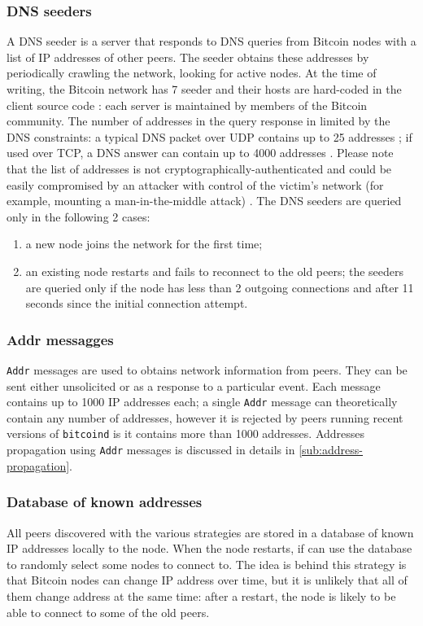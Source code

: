 \subsubsection{DNS seeders}
A DNS seeder is a server that responds to \ac{DNS} queries from Bitcoin nodes with a list of IP addresses of other peers.
The seeder obtains these addresses by periodically crawling the network, looking for active nodes.
At the time of writing, the Bitcoin network has \num{7} seeder and their hosts are hard-coded in the client source code \cite{bitcoin_dns}:
each server is maintained by members of the Bitcoin community.
The number of addresses in the query response in limited by the \ac{DNS} constraints:
a typical \ac{DNS} packet over UDP contains up to \num{25} addresses \cite{dns_stackoverflow};
if used over TCP, a \ac{DNS} answer can contain up to \num{4000} addresses \cite{dns_4000}.
Please note that the list of addresses is not cryptographically-authenticated and could be easily compromised by an attacker with control of the victim's network (for example, mounting a man-in-the-middle attack) \cite{bitcoin_guide}.
The DNS seeders are queried only in the following \num{2} cases:
\begin{enumerate}
	\item a new node joins the network for the first time;
	\item an existing node restarts and fails to reconnect to the old peers; the seeders are queried only if the node has less than \num{2} outgoing connections and after \num{11} seconds since the initial connection attempt.
\end{enumerate}

\subsubsection{Addr messagges}
\texttt{Addr} messages are used to obtains network information from peers.
They can be sent either unsolicited or as a response to a particular event.
Each message contains up to \num{1000} IP addresses each;
a single \texttt{Addr} message can theoretically contain any number of addresses, however it is rejected by peers running recent versions of \texttt{bitcoind} is it contains more than \num{1000} addresses.
Addresses propagation using \texttt{Addr} messages is discussed in details in \cref{sub:address-propagation}.

\subsubsection{Database of known addresses}
All peers discovered with the various strategies are stored in a database of known IP addresses locally to the node.
When the node restarts, if can use the database to randomly select some nodes to connect to.
The idea is behind this strategy is that Bitcoin nodes can change IP address over time, but it is unlikely that all of them change address at the same time:
after a restart, the node is likely to be able to connect to some of the old peers.

